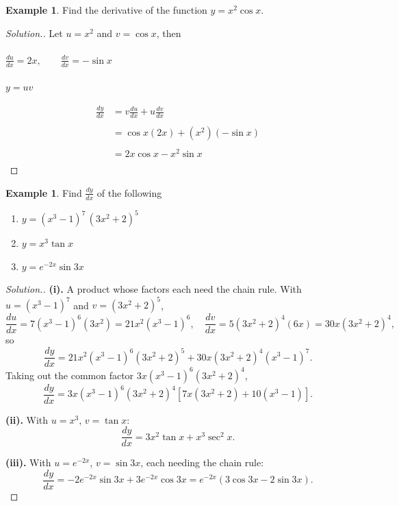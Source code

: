 \documentclass[11pt,a4paper]{article}
\theoremstyle{definition}
\newtheorem{example}[thm]{Example}
\newenvironment{solution}
  {\renewcommand{\qedsymbol}{}\begin{proof}[\textit{Solution}.]}
  {\end{proof}}
\begin{document}
\begin{example}

Find the derivative of the function $y=x^2 \cos x$.
\end{example}
\begin{solution}

Let $u=x^2$ and $v=\cos x$, then \\\\ $\frac{du}{dx}=2x,\qquad  \frac{dv}{dx}=-\sin x$\\\\
$y=uv$

\begin{align*}
\frac{dy}{dx} & = v \frac{du}{dx}+u \frac{dv}{dx}\\\\
& = \cos x (2x) + (x^2) (-\sin x)\\\\
& = 2x\cos x -x^2\sin x\\
\end{align*}
\end{solution}
\begin{example}

Find $\frac{dy}{dx}$ of the following
\begin{enumerate}
\item $y=(x^3-1)^7\, (3x^2+2)^5$\\
\item $y=x^3\tan x$\\
\item $y=e^{-2x}\sin 3x$
\end{enumerate}
\end{example}

\begin{solution}
\textbf{(i).} A product whose factors each need the chain rule. With
$u=\left(x^{3}-1\right)^{7}$ and $v=\left(3x^{2}+2\right)^{5}$,
$$\frac{du}{dx}=7\left(x^{3}-1\right)^{6}\left(3x^{2}\right)=21x^{2}\left(x^{3}-1\right)^{6},
\quad 
\frac{dv}{dx}=5\left(3x^{2}+2\right)^{4}(6x)=30x\left(3x^{2}+2\right)^{4},$$
so
$$\frac{dy}{dx}=21x^{2}\left(x^{3}-1\right)^{6}\left(3x^{2}+2\right)^{5}
+30x\left(3x^{2}+2\right)^{4}\left(x^{3}-1\right)^{7} .$$
Taking out the common factor $3x\left(x^{3}-1\right)^{6}\left(3x^{2}+2\right)^{4}$,
$$\frac{dy}{dx}=3x\left(x^{3}-1\right)^{6}\left(3x^{2}+2\right)^{4}
\left[7x\left(3x^{2}+2\right)+10\left(x^{3}-1\right)\right].$$

\textbf{(ii).} With $u=x^{3}$, $v=\tan x$:
$$\frac{dy}{dx}=3x^{2}\tan x+x^{3}\sec^{2}x .$$

\textbf{(iii).} With $u=e^{-2x}$, $v=\sin 3x$, each needing the chain rule:
$$\frac{dy}{dx}=-2e^{-2x}\sin 3x+3e^{-2x}\cos 3x
=e^{-2x}\left(3\cos 3x-2\sin 3x\right).$$
\end{solution}
\end{document}
